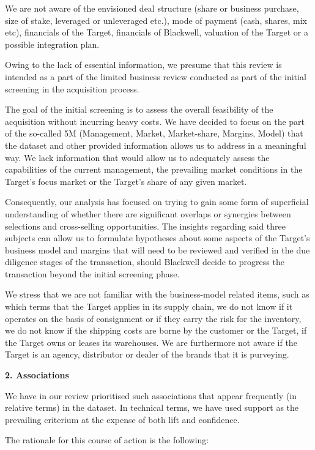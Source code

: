 \documentclass[]{article}
\begin{document}
We are not aware of the envisioned deal structure (share or business
purchase, size of stake, leveraged or unleveraged etc.), mode of payment
(cash, shares, mix etc), financials of the Target, financials of
Blackwell, valuation of the Target or a possible integration plan.

Owing to the lack of essential information, we presume that this review
is intended as a part of the limited business review conducted as part
of the initial screening in the acquisition process.

The goal of the initial screening is to assess the overall feasibility
of the acquisition without incurring heavy costs. We have decided to
focus on the part of the so-called 5M (Management, Market, Market-share,
Margins, Model) that the dataset and other provided information allows
us to address in a meaningful way. We lack information that would allow
us to adequately assess the capabilities of the current management, the
prevailing market conditions in the Target's focus market or the
Target's share of any given market.

Consequently, our analysis has focused on trying to gain some form of
superficial understanding of whether there are significant overlaps or
synergies between selections and cross-selling opportunities. The
insights regarding said three subjects can allow us to formulate
hypotheses about some aspects of the Target's business model and margins
that will need to be reviewed and verified in the due diligence stages
of the transaction, should Blackwell decide to progress the transaction
beyond the initial screening phase.

We stress that we are not familiar with the business-model related
items, such as which terms that the Target applies in its supply chain,
we do not know if it operates on the basis of consignment or if they
carry the risk for the inventory, we do not know if the shipping costs
are borne by the customer or the Target, if the Target owns or leases
its warehouses. We are furthermore not aware if the Target is an agency,
distributor or dealer of the brands that it is purveying.

\textbf{2. Associations}

We have in our review prioritised such associations that appear
frequently (in relative terms) in the dataset. In technical terms, we
have used support as the prevailing criterium at the expense of both
lift and confidence.

The rationale for this course of action is the following:
\end{document}
